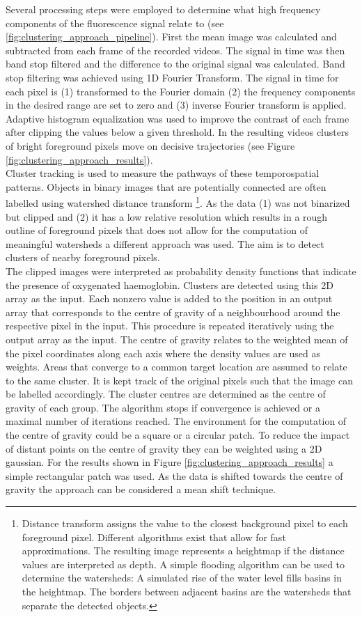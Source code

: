 Several processing steps were employed to determine what high frequency components of the fluorescence signal relate to (see \ref{fig:clustering_approach_pipeline}). First the mean image was calculated and subtracted from each frame of the recorded videos. The signal in time was then band stop filtered and the difference to the original signal was calculated. Band stop filtering was achieved using 1D Fourier Transform. The signal in time for each pixel is (1) transformed to the Fourier domain (2) the frequency components in the desired range are set to zero and (3) inverse Fourier transform is applied. Adaptive histogram equalization was used to improve the contrast of each frame after clipping the values below a given threshold. In the resulting videos clusters of bright foreground pixels move on decisive trajectories (see Figure \ref{fig:clustering_approach_results}).\\
Cluster tracking is used to measure the pathways of these temporospatial patterns. Objects in binary images that are potentially connected are often labelled using watershed distance transform \parencite{arganda-carreras2016distance} \footnote{Distance transform assigns the value to the closest background pixel to each foreground pixel. Different algorithms exist that allow for fast approximations. The resulting image represents a heightmap if the distance values are interpreted as depth. A simple flooding algorithm can be used to determine the watersheds: A simulated rise of the water level fills basins in the heightmap. The borders between adjacent basins are the watersheds that separate the detected objects.}. As the data (1) was not binarized but clipped and (2) it has a low relative resolution which results in a rough outline of foreground pixels that does not allow for the computation of meaningful watersheds a different approach was used. The aim is to detect clusters of nearby foreground pixels. \\
The clipped images were interpreted as probability density functions that indicate the presence of oxygenated haemoglobin. Clusters are detected using this 2D array as the input. Each nonzero value is added to the position in an output array that corresponds to the centre of gravity of a neighbourhood around the respective pixel in the input. This procedure is repeated iteratively using the output array as the input. The centre of gravity relates to the weighted mean of the pixel coordinates along each axis where the density values are used as weights. Areas that converge to a common target location are assumed to relate to the same cluster. It is kept track of the original pixels such that the image can be labelled accordingly. The cluster centres are determined as the centre of gravity of each group. The algorithm stops if convergence is achieved or a maximal number of iterations reached. The environment for the computation of the centre of gravity could be a square or a circular patch. To reduce the impact of distant points on the centre of gravity they can be weighted using a 2D gaussian. For the results shown in Figure \ref{fig:clustering_approach_results} a simple rectangular patch was used. As the data is shifted towards the centre of gravity the approach can be considered a mean shift technique. \\
